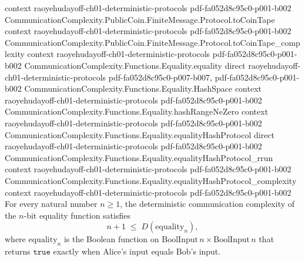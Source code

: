 \begin{theorem}
  {context}
  {raoyehudayoff-ch01-deterministic-protocols}
  {pdf-fa052d8c95c0-p001-b002}
\proofstep
  {CommunicationComplexity.PublicCoin.FiniteMessage.Protocol.toCoinTape}
  {context}
  {raoyehudayoff-ch01-deterministic-protocols}
  {pdf-fa052d8c95c0-p001-b002}
\proofstep
  {CommunicationComplexity.PublicCoin.FiniteMessage.Protocol.toCoinTape_complexity}
  {context}
  {raoyehudayoff-ch01-deterministic-protocols}
  {pdf-fa052d8c95c0-p001-b002}
\proofstep
  {CommunicationComplexity.Functions.Equality.equality}
  {direct}
  {raoyehudayoff-ch01-deterministic-protocols}
  {pdf-fa052d8c95c0-p007-b007,
    pdf-fa052d8c95c0-p001-b002}
\proofstep
  {CommunicationComplexity.Functions.Equality.HashSpace}
  {context}
  {raoyehudayoff-ch01-deterministic-protocols}
  {pdf-fa052d8c95c0-p001-b002}
\proofstep
  {CommunicationComplexity.Functions.Equality.hashRangeNeZero}
  {context}
  {raoyehudayoff-ch01-deterministic-protocols}
  {pdf-fa052d8c95c0-p001-b002}
\proofstep
  {CommunicationComplexity.Functions.Equality.equalityHashProtocol}
  {direct}
  {raoyehudayoff-ch01-deterministic-protocols}
  {pdf-fa052d8c95c0-p001-b002}
\proofstep
  {CommunicationComplexity.Functions.Equality.equalityHashProtocol_rrun}
  {context}
  {raoyehudayoff-ch01-deterministic-protocols}
  {pdf-fa052d8c95c0-p001-b002}
\proofstep
  {CommunicationComplexity.Functions.Equality.equalityHashProtocol_complexity}
  {context}
  {raoyehudayoff-ch01-deterministic-protocols}
  {pdf-fa052d8c95c0-p001-b002}
For every natural number $n \ge 1$, the deterministic communication complexity of the
$n$-bit equality function satisfies
\[
  n + 1 \;\le\; D(\mathrm{equality}_n),
\]
where $\mathrm{equality}_n$ is the Boolean function on $\mathrm{BoolInput}\,n \times
\mathrm{BoolInput}\,n$ that returns $\mathtt{true}$ exactly when Alice's input equals
Bob's input.
\end{theorem}

